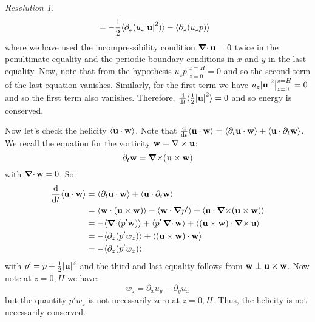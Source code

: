 \documentclass[10pt,a4paper]{article}
\theoremstyle{definition}
\theoremstyle{remark}
\newtheorem*{res}{Resolution}
\begin{document}
\begin{res}
\begin{align*}
                                               & = -\frac{1}{2} \langle \partial_z({u}_z\abs{\boldsymbol{\mathrm{u}}}^2)\rangle - \langle \partial_z({u}_zp)\rangle
  \end{align*}
  where we have used the incompressibility condition $\operatorname{\boldsymbol{\mathrm{\nabla}}\cdot}\boldsymbol{\mathrm{u}}=0$ twice in the penultimate equality and the periodic boundary conditions in $x$ and $y$ in the last equality. Now, note that from the hypothesis $u_zp\big|_{z=0}^{z=H} = 0$ and so the second term of the last equation vanishes. Similarly, for the first term we have $u_z\abs{\boldsymbol{\mathrm{u}}}^2\big|_{z=0}^{z=H} = 0$ and so the first term also vanishes. Therefore, $\dv{}{t}\langle \frac{1}{2}\abs{\boldsymbol{\mathrm{u}}}^2\rangle = 0$ and so energy is conserved.

  Now let's check the helicity $\langle \boldsymbol{\mathrm{u}}\cdot\boldsymbol{\mathrm{w}}\rangle$. Note that $\dv{}{t}\langle \boldsymbol{\mathrm{u}}\cdot\boldsymbol{\mathrm{w}}\rangle =  \langle \partial_t\boldsymbol{\mathrm{u}}\cdot\boldsymbol{\mathrm{w}}\rangle+ \langle \boldsymbol{\mathrm{u}}\cdot\partial_t\boldsymbol{\mathrm{w}}\rangle$.
  We recall the equation for the vorticity $\boldsymbol{\mathrm{w}} = \nabla\times\boldsymbol{\mathrm{u}}$:
  \begin{equation*}
    \partial_t \boldsymbol{\mathrm{w}} = \operatorname{\boldsymbol{\mathrm{\nabla}}\times}(\boldsymbol{\mathrm{u}}\times\boldsymbol{\mathrm{w}})
  \end{equation*}
  with $\operatorname{\boldsymbol{\mathrm{\nabla}}\cdot}\boldsymbol{\mathrm{w}}=0$.
  So:
  \begin{align*}
    \dv{}{t} \langle \boldsymbol{\mathrm{u}}\cdot\boldsymbol{\mathrm{w}}\rangle & =\langle \partial_t\boldsymbol{\mathrm{u}}\cdot\boldsymbol{\mathrm{w}}\rangle+ \langle \boldsymbol{\mathrm{u}}\cdot\partial_t\boldsymbol{\mathrm{w}}\rangle                                                      \\
                                              & =\langle \boldsymbol{\mathrm{w}}\cdot (\boldsymbol{\mathrm{u}}\times\boldsymbol{\mathrm{w}}) \rangle - \langle \boldsymbol{\mathrm{w}}\cdot\grad p'\rangle + \langle \boldsymbol{\mathrm{u}}\cdot\operatorname{\boldsymbol{\mathrm{\nabla}}\times}(\boldsymbol{\mathrm{u}}\times\boldsymbol{\mathrm{w}})\rangle \\
                                              & = - \langle \operatorname{\boldsymbol{\mathrm{\nabla}}\cdot}(p'\boldsymbol{\mathrm{w}})\rangle+\langle p'\operatorname{\boldsymbol{\mathrm{\nabla}}\cdot}\boldsymbol{\mathrm{w}}\rangle  +\langle (\boldsymbol{\mathrm{u}} \times \boldsymbol{\mathrm{w}})\cdot\operatorname{\boldsymbol{\mathrm{\nabla}}\times}\boldsymbol{\mathrm{u}}\rangle                      \\
                                              & = -  \langle \partial_z(p'w_z)\rangle + \langle (\boldsymbol{\mathrm{u}} \times \boldsymbol{\mathrm{w}})\cdot\boldsymbol{\mathrm{w}}\rangle                                                     \\
                                              & = - \langle \partial_z(p'w_z)\rangle
  \end{align*}
  with $p' = p + \frac{1}{2}\abs{\boldsymbol{\mathrm{u}}}^2$ and the third and last equality follows from $\boldsymbol{\mathrm{w}}\perp \boldsymbol{\mathrm{u}}\times\boldsymbol{\mathrm{w}}$. Now note at $z=0,H$ we have:
  \begin{equation}
    w_z =\partial_x u_y - \partial_y u_x
  \end{equation}
  but the quantity $p'w_z$ is not necessarily zero at $z=0,H$. Thus, the helicity is not necessarily conserved.
\end{res}
\end{document}
